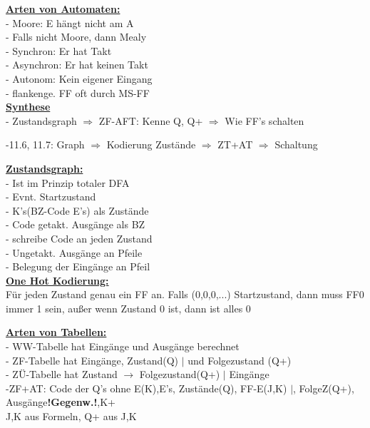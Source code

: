 \documentclass[11pt]{article}
\begin{document}
\begin{minipage}{0.33\textwidth}

\underline{\textbf{Arten von Automaten:}}\\
- Moore: E hängt nicht am A\\
- Falls nicht Moore, dann Mealy\\
- Synchron: Er hat Takt\\
- Asynchron: Er hat keinen Takt\\
- Autonom: Kein eigener Eingang\\
- flankenge. FF oft durch MS-FF\\

\underline{\textbf{Synthese}}\\
- Zustandsgraph $\Rightarrow$ ZF-AFT: Kenne Q, Q+ $\Rightarrow$ Wie FF's schalten

-11.6, 11.7: Graph $\Rightarrow$ Kodierung Zustände $\Rightarrow$ ZT+AT $\Rightarrow$ Schaltung
\vspace{5cm}

\underline{\textbf{Zustandsgraph:}}\\
- Ist im Prinzip totaler DFA\\
- Evnt. Startzustand\\
- K's(BZ-Code E's) als Zustände\\
- Code getakt. Ausgänge als BZ\\
- schreibe Code an jeden Zustand\\
- Ungetakt. Ausgänge an Pfeile\\
- Belegung der Eingänge an Pfeil\\

\underline{\textbf{One Hot Kodierung:}}\\
Für jeden Zustand genau ein FF an. Falls (0,0,0,...) Startzustand, dann muss FF0 immer 1 sein, außer wenn Zustand 0 ist, dann ist alles 0
\end{minipage}%

\vspace*{-0.3 cm}
\underline{\textbf{Arten von Tabellen:}}\\
- WW-Tabelle hat Eingänge und Ausgänge berechnet\\
- ZF-Tabelle hat Eingänge, Zustand(Q) $|$ und Folgezustand (Q+)\\
- ZÜ-Tabelle hat Zustand $\rightarrow$ Folgezustand(Q+) $|$ Eingänge\\
-ZF+AT: Code der Q's ohne E(K),E's, Zustände(Q), FF-E(J,K) $|$, FolgeZ(Q+), Ausgänge\textbf{!Gegenw.!},K+\\
\phantom{ss} J,K aus Formeln, Q+ aus J,K
\end{document}
